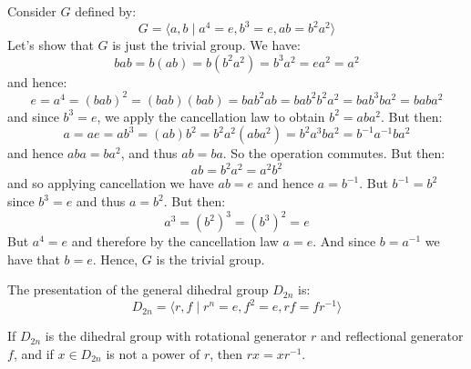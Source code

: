 \documentclass{article}                                                        %
\begin{document}
            \begin{example}
                Consider $G$ defined by:
                \begin{equation}
                    G=\langle{a,b}\;|\;a^{4}=e,b^{3}=e,ab=b^{2}a^{2}\rangle
                \end{equation}
                Let's show that $G$ is just the trivial group. We have:
                \begin{equation}
                    bab=b(ab)=b(b^{2}a^{2})=b^{3}a^{2}=ea^{2}=a^{2}
                \end{equation}
                and hence:
                \begin{equation}
                    e=a^{4}=(bab)^{2}=(bab)(bab)=bab^{2}ab=
                    bab^{2}b^{2}a^{2}=bab^{3}ba^{2}=baba^{2}
                \end{equation}
                and since $b^{3}=e$, we apply the cancellation law to obtain
                $b^{2}=aba^{2}$. But then:
                \begin{equation}
                    a=ae=ab^{3}=(ab)b^{2}=b^{2}a^{2}(aba^{2})
                    =b^{2}a^{3}ba^{2}=b^{\minus{1}}a^{\minus{1}}ba^{2}
                \end{equation}
                and hence $aba=ba^{2}$, and thus $ab=ba$. So the operation
                commutes. But then:
                \begin{equation}
                    ab=b^{2}a^{2}=a^{2}b^{2}
                \end{equation}
                and so applying cancellation we have $ab=e$ and hence
                $a=b^{\minus{1}}$. But $b^{\minus{1}}=b^{2}$ since $b^{3}=e$
                and thus $a=b^{2}$. But then:
                \begin{equation}
                    a^{3}=(b^{2})^{3}=(b^{3})^{2}=e
                \end{equation}
                But $a^{4}=e$ and therefore by the cancellation law $a=e$.
                And since $b=a^{\minus{1}}$ we have that $b=e$. Hence, $G$ is
                the trivial group.
            \end{example}
            The presentation of the general dihedral group $D_{2n}$ is:
            \begin{equation}
                D_{2n}=\langle{r,f}\;|\;r^{n}=e,f^{2}=e,rf=fr^{\minus{1}}\rangle
            \end{equation}
            \begin{theorem}
                If $D_{2n}$ is the dihedral group with rotational generator $r$
                and reflectional generator $f$, and if $x\in{D}_{2n}$ is not a
                power of $r$, then $rx=xr^{\minus{1}}$.
            \end{theorem}
\end{document}
